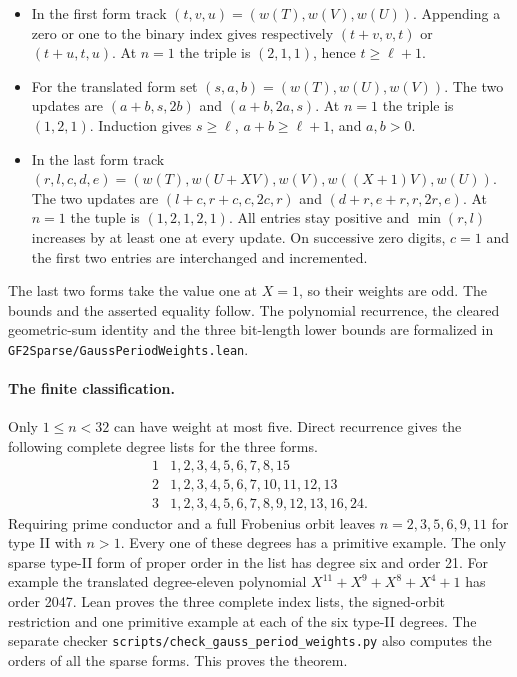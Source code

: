 \documentclass[11pt]{article}
\begin{document}
\begin{itemize}
\item In the first form track \((t,v,u)=(w(T),w(V),w(U))\).
Appending a zero or one to the binary index gives respectively
\((t+v,v,t)\) or \((t+u,t,u)\). At \(n=1\) the triple is
\((2,1,1)\), hence \(t\ge\ell+1\).
\item For the translated form set \((s,a,b)=(w(T),w(U),w(V))\).
The two updates are \((a+b,s,2b)\) and \((a+b,2a,s)\).
At \(n=1\) the triple is \((1,2,1)\). Induction gives
\(s\ge\ell\), \(a+b\ge\ell+1\), and \(a,b>0\).
\item In the last form track \((r,l,c,d,e)=(w(T),w(U+XV),w(V),
w((X+1)V),w(U))\). The two updates are \((l+c,r+c,c,2c,r)\)
and \((d+r,e+r,r,2r,e)\). At \(n=1\) the tuple is \((1,2,1,2,1)\).
All entries stay positive and \(\min(r,l)\) increases by at least one
at every update. On successive zero digits, \(c=1\) and the first
two entries are interchanged and incremented.
\end{itemize}
The last two forms take the value one at \(X=1\), so their weights
are odd. The bounds and the asserted equality follow.
The polynomial recurrence, the cleared geometric-sum identity and the
three bit-length lower bounds are formalized in
\nolinkurl{GF2Sparse/GaussPeriodWeights.lean}.

\paragraph{The finite classification.}
Only \(1\le n<32\) can have weight at most five. Direct recurrence
gives the following complete degree lists for the three forms.
\[
\begin{array}{c|l}
1&1,2,3,4,5,6,7,8,15\\
2&1,2,3,4,5,6,7,10,11,12,13\\
3&1,2,3,4,5,6,7,8,9,12,13,16,24.
\end{array}
\]
Requiring prime conductor and a full Frobenius orbit leaves
\(n=2,3,5,6,9,11\) for type II with \(n>1\). Every one of these
degrees has a primitive example. The only sparse type-II form
of proper order in the list has degree six and order 21.
For example the translated degree-eleven polynomial
\(X^{11}+X^9+X^8+X^4+1\) has order 2047.
Lean proves the three complete index lists, the signed-orbit
restriction and one primitive example at each of the six type-II degrees.
The separate checker \nolinkurl{scripts/check_gauss_period_weights.py}
also computes the orders of all the sparse forms. This proves the theorem.
\end{document}
